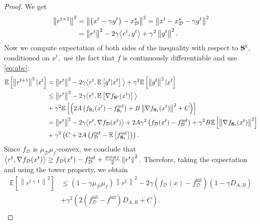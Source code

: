 \documentclass{article}
\newcommand{\bb}{\mathbb}
\newcommand{\cD}{\mathcal{D}}
\newcommand{\Exp}[1]{{\bb E}\left[#1\right]}
\theoremstyle{plain}
\newcommand{\tf}{f_{\mathcal{D}}}
\newcommand{\mS}{{\bf S}}
\theoremstyle{plain}
\theoremstyle{definition}
\theoremstyle{remark}
\begin{document}
\begin{proof}
We get
\begin{equation*}
	\begin{split}
		\left\|r^{t+1}\right\|^2 & = \left\|\left(x^t-\gamma g^t \right) - x_\cD^\star\right\|^2  = \left\|x^t-x_\cD^\star - \gamma g^t\right\|^2 \\
		& = \left\|r^{t}\right\|^2 - 2\gamma\big{<}r^t, g^t\big{>} + \gamma^2\left\|g^t\right\|^2.
	\end{split}
\end{equation*}
Now we compute expectation of both sides of the inequality with respect to $\mS^{t}$, conditioned on $x^t,$ use the fact that $f$ is continuously differentiable and use \eqref{eq:abc}:
\begin{equation*}
	\begin{split}
		\mathbb{E}\left[\left\|r^{t+1}\right\|^2|x^t\right] &= \left\|r^{t}\right\|^2 - 2\gamma\big{<}r^t, \Exp{g^t|x^t}\big{>} + \gamma^2\Exp{\left\|g^t\right\|^2|x^t}\\
		& \leq \left\|r^{t}\right\|^2 - 2\gamma\big{<}r^t, \Exp{\nabla f_{\mS^{t}}(x^t)}\big{>}\\
  &+\gamma^2\Exp{\left(2A\left(f_{\mS_t}(x^t) - f^{\inf}_{\mS_t}\right) + B\left\|\nabla f_{\mS_t}(x^t)\right\|^2 + C\right)}\\
		& = \left\|r^{t}\right\|^2 - 2\gamma\big{<}r^t, \nabla \tf(x^t)\big{>} + 2A\gamma^2\left(\tf(x^t) - \tf^{\inf}\right)+\gamma^2B\Exp{\left\|\nabla f_{\mS_t}(x^t)\right\|^2}\\
		& +\gamma^2\left(C + 2A\left(\tf^{\inf} - \Exp{f_{\mS_t}^{\inf}}\right)\right).\\
	\end{split}
\end{equation*}
Since $\tf$ is $\mu_{\mathcal{D}}\mu_f$-convex, we conclude that $\big{<}r^t, \nabla \tf(x^t)\big{>}\geq \tf(x^t) - \tf^{\inf} + \frac{\mu_{\mathcal{D}}\mu_f}{2}\left\|r^t\right\|^2.$ Therefore, taking the expectation and using the tower property, we obtain
\begin{equation*}
	\begin{split}
		\Exp{\left\|r^{t+1}\right\|^2} & \leq \left(1-\gamma\mu_{\mathcal{D}}\mu_f\right)\left\|r^{t}\right\|^2 - 2\gamma\left(\tf(x) - \tf^{\inf}\right)\left(1 - \gamma D_{A,B}\right)\\ & + \gamma^2\left(2\left(\tf^{\inf} - f^{\inf}\right)D_{A,B}+C\right).\\
	\end{split}
\end{equation*}

\end{proof}
\end{document}
